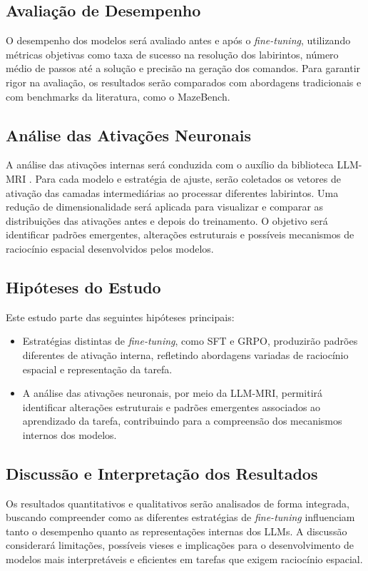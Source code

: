 \subsection{Avaliação de Desempenho}

O desempenho dos modelos será avaliado antes e após o \textit{fine-tuning}, utilizando métricas objetivas como taxa de sucesso na resolução dos labirintos, número médio de passos até a solução e precisão na geração dos comandos. Para garantir rigor na avaliação, os resultados serão comparados com abordagens tradicionais e com benchmarks da literatura, como o MazeBench.

\subsection{Análise das Ativações Neuronais}

A análise das ativações internas será conduzida com o auxílio da biblioteca LLM-MRI \cite{costa2024llmmri}. Para cada modelo e estratégia de ajuste, serão coletados os vetores de ativação das camadas intermediárias ao processar diferentes labirintos. Uma redução de dimensionalidade será aplicada para visualizar e comparar as distribuições das ativações antes e depois do treinamento. O objetivo será identificar padrões emergentes, alterações estruturais e possíveis mecanismos de raciocínio espacial desenvolvidos pelos modelos.

\subsection{Hipóteses do Estudo}

Este estudo parte das seguintes hipóteses principais:
\begin{itemize}
    \item[H1:] Estratégias distintas de \textit{fine-tuning}, como SFT e GRPO, produzirão padrões diferentes de ativação interna, refletindo abordagens variadas de raciocínio espacial e representação da tarefa.
    \item[H2:] A análise das ativações neuronais, por meio da LLM-MRI, permitirá identificar alterações estruturais e padrões emergentes associados ao aprendizado da tarefa, contribuindo para a compreensão dos mecanismos internos dos modelos.
\end{itemize}

\subsection{Discussão e Interpretação dos Resultados}

Os resultados quantitativos e qualitativos serão analisados de forma integrada, buscando compreender como as diferentes estratégias de \textit{fine-tuning} influenciam tanto o desempenho quanto as representações internas dos LLMs. A discussão considerará limitações, possíveis vieses e implicações para o desenvolvimento de modelos mais interpretáveis e eficientes em tarefas que exigem raciocínio espacial.
